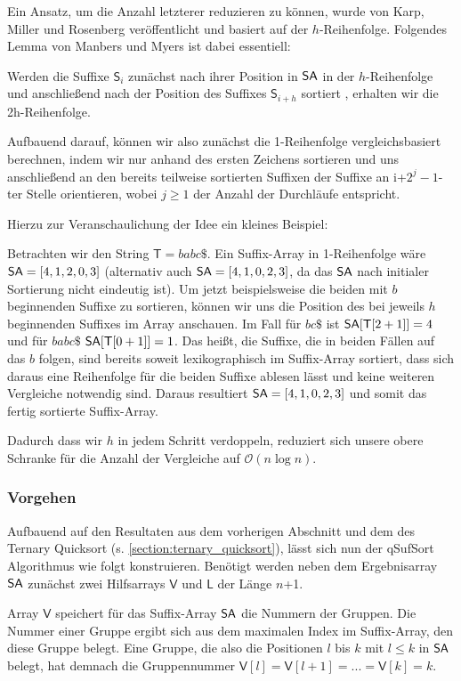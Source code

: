 Ein Ansatz, um die Anzahl letzterer reduzieren zu können, wurde von Karp, Miller und Rosenberg \cite{Karp} veröffentlicht und basiert auf der $h$-Reihenfolge. Folgendes Lemma von Manbers und Myers \cite{Manber1993} ist dabei essentiell:
\begin{lemma}
\label{manmyers}
Werden die Suffixe $\mathsf{S}_i$ zunächst nach ihrer Position in $\sa$ in der $h$-Reihenfolge und anschließend nach der Position des Suffixes $\mathsf{S}_{i+h}$ sortiert , erhalten wir die 2h-Reihenfolge.
\end{lemma}
Aufbauend darauf, können wir also zunächst die 1-Reihenfolge vergleichsbasiert berechnen, indem wir nur anhand des ersten Zeichens sortieren und uns anschließend an den bereits teilweise sortierten Suffixen der Suffixe an i+$2^j-1$-ter Stelle orientieren, wobei $j \geq 1$ der Anzahl der Durchläufe entspricht.

Hierzu zur Veranschaulichung der Idee ein kleines Beispiel:

Betrachten wir den String $\mathsf{T} =  babc\$ $. Ein Suffix-Array in 1-Reihenfolge wäre $\sa=[4,1,2,0,3]$ (alternativ auch $\sa=[4,1,0,2,3]$, da das $\sa$ nach initialer Sortierung nicht eindeutig ist). Um jetzt beispielsweise die beiden mit $ b $ beginnenden Suffixe zu sortieren, können wir uns die Position des bei jeweils $h$ beginnenden Suffixes im Array anschauen. Im Fall für $ bc\$ $  ist $\sa[\mathsf{T}[2+1]]=4$ und für $ babc\$ $ $\sa[\mathsf{T}[0+1]]=1$. Das heißt, die Suffixe, die in beiden Fällen auf das $ b $ folgen, sind bereits soweit lexikographisch im Suffix-Array sortiert, dass sich daraus eine Reihenfolge für die beiden Suffixe ablesen lässt und keine weiteren Vergleiche notwendig sind. Daraus resultiert $\sa=[4,1,0,2,3]$ und somit das fertig sortierte Suffix-Array.

Dadurch dass wir $h$ in jedem Schritt verdoppeln, reduziert sich unsere obere Schranke für die Anzahl der Vergleiche auf $\mathcal{O}(n\log n)$.
 \subsubsection{Vorgehen}
Aufbauend auf den Resultaten aus dem vorherigen Abschnitt und dem des Ternary Quicksort (s. \ref{section:ternary_quicksort}), lässt sich nun der qSufSort Algorithmus wie folgt konstruieren.
Benötigt werden neben dem Ergebnisarray $\sa$ zunächst zwei Hilfsarrays $\mathsf{V}$ und $\mathsf{L}$ der Länge $n$+1.

Array $\mathsf{V}$ speichert für das Suffix-Array $\sa$ die Nummern der Gruppen. Die Nummer einer Gruppe ergibt sich aus dem maximalen Index im Suffix-Array, den diese Gruppe belegt. Eine Gruppe, die also die Positionen $l$ bis $k$ mit $l \leq k$ in $\sa$ belegt, hat demnach die Gruppennummer $\mathsf{V}[l]=\mathsf{V}[l+1]=...=\mathsf{V}[k]=k$.


